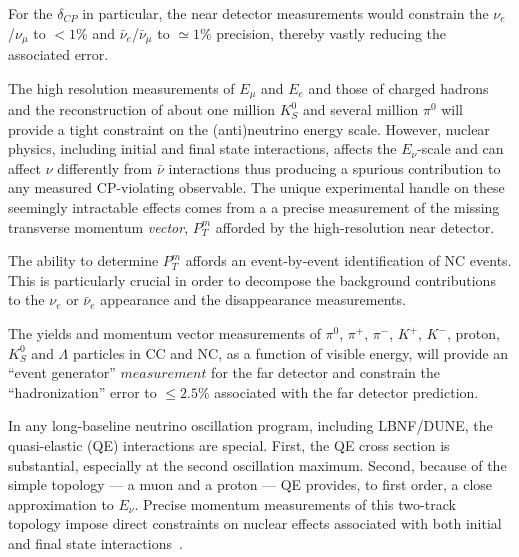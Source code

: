 \noindent
For the $\delta_{CP}$ in particular, the near detector measurements would constrain the $\nu_e$/$\nu_\mu$ to 
$<1\%$ and $\bar \nu_e$/$\bar \nu_\mu$ to $\simeq 1\%$ precision, thereby vastly reducing the associated error. 



The high resolution 
measurements of $E_\mu$ and $E_e$ and those of charged hadrons and the reconstruction of about one 
million $K^0_S$ and several million $\pi^0$ will provide a tight constraint on the (anti)neutrino energy scale. 
However, nuclear physics, including initial and final state interactions, 
 affects the $E_\nu$-scale and can affect $\nu$ differently from $\bar\nu$ interactions thus  
producing a spurious contribution to any measured CP-violating observable. 
The unique experimental handle on these seemingly intractable effects comes from a 
a precise measurement of the missing transverse momentum {\it vector},{ \bf{ $P^m_T$}} afforded by the 
high-resolution near detector. 


The ability to determine {\bf{$P^m_T$}} affords an event-by-event 
identification of NC events. This is particularly crucial in order to decompose the background contributions to 
the $\nu_e$ or $\bar \nu_e$ appearance and the disappearance measurements. 


The yields and momentum vector measurements of %
$\pi^0$, $\pi^+$, $\pi^-$, $K^+$, $K^-$, proton, $K^0_S$ and $\Lambda$ particles in CC and NC, as a function of 
visible energy, will provide an ``event generator'' $measurement$ for the far detector and constrain the 
``hadronization'' error to $\leq 2.5\%$ associated with the far detector prediction. 



In any long-baseline neutrino oscillation program, including LBNF/DUNE, 
the quasi-elastic (QE) interactions are special. First, the QE cross section is substantial, especially at the second oscillation maximum. 
Second, because of the simple topology --- a muon and a proton --- QE provides, to  first order, 
a close approximation to $E_\nu$.  
Precise momentum measurements  of this two-track topology impose direct constraints on nuclear effects 
associated with both initial and final state interactions~\cite{near detector-QE}. 

